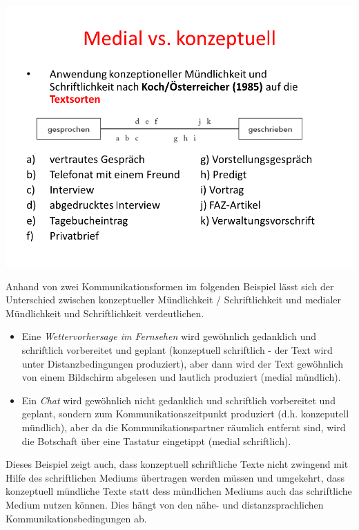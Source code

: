 \documentclass[
  letterpaper,
  DIV=11,
  numbers=noendperiod]{scrreprt}
\begin{document}
\includegraphics[width=1\textwidth,height=\textheight]{./pictures/nahe_distanz_diagram2.png}

Anhand von zwei Kommunikationsformen im folgenden Beispiel lässt sich
der Unterschied zwischen konzeptueller Mündlichkeit / Schriftlichkeit
und medialer Mündlichkeit und Schriftlichkeit verdeutlichen.

\begin{itemize}
\item
  Eine \emph{Wettervorhersage im Fernsehen} wird gewöhnlich gedanklich
  und schriftlich vorbereitet und geplant (konzeptuell schriftlich - der
  Text wird unter Distanzbedingungen produziert), aber dann wird der
  Text gewöhnlich von einem Bildschirm abgelesen und lautlich produziert
  (medial mündlich).
\item
  Ein \emph{Chat} wird gewöhnlich nicht gedanklich und schriftlich
  vorbereitet und geplant, sondern zum Kommunikationszeitpunkt
  produziert (d.h. konzeputell mündlich), aber da die
  Kommunikationspartner räumlich entfernt sind, wird die Botschaft über
  eine Tastatur eingetippt (medial schriftlich).
\end{itemize}

Dieses Beispiel zeigt auch, dass konzeptuell schriftliche Texte nicht
zwingend mit Hilfe des schriftlichen Mediums übertragen werden müssen
und umgekehrt, dass konzeptuell mündliche Texte statt dess mündlichen
Mediums auch das schriftliche Medium nutzen können. Dies hängt von den
nähe- und distanzsprachlichen Kommunikationsbedingungen ab.
\end{document}

